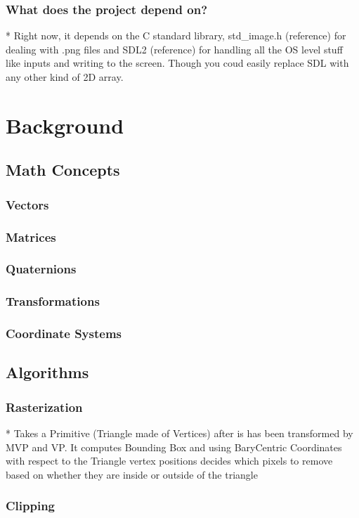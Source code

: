 \documentclass{article}
\begin{document}
\subsubsection{What does the project depend on?}
* Right now, it depends on the C standard library, std\_image.h (reference) for dealing with .png files and SDL2 (reference) for handling all the OS level stuff like inputs and writing to the screen. Though you coud easily replace SDL with any other kind of 2D array.

\section{Background}

\subsection{Math Concepts}
\subsubsection{Vectors}
\subsubsection{Matrices}
\subsubsection{Quaternions}
\subsubsection{Transformations}
\subsubsection{Coordinate Systems}

\subsection{Algorithms}
\subsubsection{Rasterization}
* Takes a Primitive (Triangle made of Vertices) after is has been transformed by MVP and VP. It computes Bounding Box and using BaryCentric Coordinates with respect to the Triangle vertex positions decides which pixels to remove based on whether they are inside or outside of the triangle
\subsubsection{Clipping}
\end{document}
